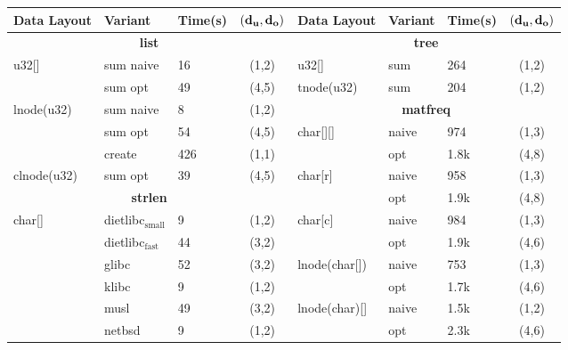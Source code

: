 \begin{figure}[H]
\begin{scriptsize}
\begin{tabular}{lllclllc}
\toprule
{\bf Data Layout} & {\bf Variant} & {\bf Time(s)} & {\bf ${\tt \bf ( d_u, d_o )}$} & {\bf Data Layout} & {\bf Variant} & {\bf Time(s)} & {\bf ${\tt \bf ( d_u, d_o )}$} \\
\midrule
\multicolumn{4}{c}{\bf list} &                                              \multicolumn{4}{c}{\bf tree} \\
u32[] & sum naive & 16 & (1,2) &                                           u32[] & sum & 264 & (1,2) \\
      & sum opt & 49 & (4,5) &                                             tnode(u32) & sum & 204 & (1,2) \\
lnode(u32) & sum naive & 8 & (1,2) &                                      \multicolumn{4}{c}{\bf matfreq} \\             
           & sum opt & 54 & (4,5) &                                       char[][] & naive & 974 & (1,3) \\                                      
           & create & 426 & (1,1) &                                                & opt & 1.8k & (4,8) \\                                       
clnode(u32) & sum opt & 39 & (4,5) &                                      char[r] & naive & 958 & (1,3) \\                                       
\multicolumn{4}{c}{\bf strlen}   &                                            & opt & 1.9k & (4,8) \\                                        
char[] & dietlibc$\mathrm{_{small}}$ & 9 & (1,2) &                             char[c] & naive & 984 & (1,3) \\                                       
       & dietlibc$\mathrm{_{fast}}$ & 44 & (3,2) &                                     & opt & 1.9k & (4,6) \\
       & glibc & 52 & (3,2) &                                                  lnode(char[]) & naive & 753 & (1,3) \\
       & klibc & 9 & (1,2) &                                                         & opt & 1.7k & (4,6) \\ 
       & musl & 49 & (3,2) &                                                   lnode(char)[] & naive & 1.5k & (1,2) \\
       & netbsd & 9 & (1,2) &                                                                & opt & 2.3k & (4,6) \\

\end{tabular}
\end{scriptsize}
\end{figure}
